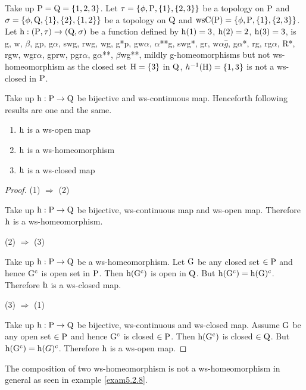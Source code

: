\begin{exm}\label{exm5.2.7}
Take up $\mathrm{P}=\mathrm{Q}= \{1, 2, 3\}$. Let $\tau= \{\phi, \mathrm{P}, \{1\}, \{2,3\}\}$ be a topology on $\mathrm{P}$ and $\sigma=\{\phi, \mathrm{Q}, \{1\},\{2\}, \{1,2\}\}$ be a topology on $\mathrm{Q}$ and $\mathrm{ws}\mathrm{C}(\mathrm{P})= \{\phi, \mathrm{P},\{1\},\{2,3\}\}$. Let $\mathrm{h}: (\mathrm{P}, \tau )\to (\mathrm{Q}, \sigma)$ be a function defined by $\mathrm{h}(1)=3$, $\mathrm{h}(2)= 2$, $\mathrm{h}(3)=3$, is g, w, $\beta$, gp, g$\alpha$, swg, rwg, wg, g*p, gw$\alpha$, $\alpha${*}{*}g, swg*, gr, w$\alpha\hat{g}$, g$\alpha$*, rg, rg$\alpha$, R*, rgw, wgr$\alpha$, gprw, pgr$\alpha$, g$\alpha${*}{*}, $\beta$wg{*}{*}, mildly g-homeomorphisms but not ws-homeomorphism as the closed set $\mathrm{H}=\{3\}$ in $\mathrm{Q}$, $h^{-1} (\mathrm{H})=\{1,3\}$ is not a ws-closed in $\mathrm{P}$.
\end{exm}

\begin{thm}\label{thm5.2.5}
Take up $\mathrm{h}: \mathrm{P}\to \mathrm{Q}$ be bijective and ws-continuous map. Henceforth following results are one and the same.
\begin{enumerate}[(1)]
\item $\mathrm{h}$ is a ws-open map
\item $\mathrm{h}$ is a ws-homeomorphism
\item $\mathrm{h}$ is a ws-closed map
\end{enumerate}
\end{thm}

\begin{proof}
(1) $\Rightarrow$ (2)

Take up $\mathrm{h}: \mathrm{P}\to \mathrm{Q}$ be bijective, ws-continuous map and ws-open map. Therefore $\mathrm{h}$ is a ws-homeomorphism.

(2) $\Rightarrow$ (3)

Take up $\mathrm{h}: \mathrm{P}\to \mathrm{Q}$ be a ws-homeomorphism. Let $\mathrm{G}$ be any closed set $\in \mathrm{P}$ and hence $\mathrm{G}^{\text{c}}$ is open set in $\mathrm{P}$. Then $\mathrm{h}(\mathrm{G}^{\text{c}})$ is open in $\mathrm{Q}$. But $\mathrm{h}(\mathrm{G}^{\text{c}})=\mathrm{h}(\mathrm{G})^{\text{c}}$. Therefore $\mathrm{h}$ is a ws-closed map.

(3) $\Rightarrow$ (1)

Take up $\mathrm{h}: \mathrm{P}\to \mathrm{Q}$ be bijective, ws-continuous and ws-closed map. Assume $\mathrm{G}$ be any open set $\in \mathrm{P}$ and hence $\mathrm{G}^{\text{c}}$ is closed $\in \mathrm{P}$. Then $\mathrm{h}(\mathrm{G}^{\text{c}})$ is closed $\in \mathrm{Q}$. But $\mathrm{h}(\mathrm{G}^{\text{c}})=\mathrm{h}(G)^{\text{c}}$. Therefore $\mathrm{h}$ is a ws-open map.
\end{proof}

\begin{rem}\label{rem5.2.2}
The composition of two ws-homeomorphism is not a ws-homeomor\-phism in general as seen in example \ref{exam5.2.8}.
\end{rem}

